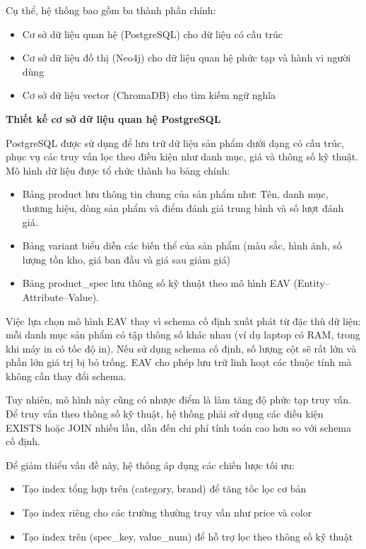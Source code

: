 Cụ thể, hệ thống bao gồm ba thành phần chính:

\begin{itemize}
\item Cơ sở dữ liệu quan hệ (PostgreSQL) cho dữ liệu có cấu trúc
\item Cơ sở dữ liệu đồ thị (Neo4j) cho dữ liệu quan hệ phức tạp và hành vi người dùng
\item Cơ sở dữ liệu vector (ChromaDB) cho tìm kiếm ngữ nghĩa
\end{itemize}

\textbf{Thiết kế cơ sở dữ liệu quan hệ PostgreSQL}

PostgreSQL được sử dụng để lưu trữ dữ liệu sản phẩm dưới dạng có cấu trúc, phục vụ các truy vấn lọc theo điều kiện như danh mục, giá và thông số kỹ thuật. Mô hình dữ liệu được tổ chức thành ba bảng chính:

\begin{itemize}
\item Bảng product lưu thông tin chung của sản phẩm như: Tên, danh mục, thương hiệu, dòng sản phẩm và điểm đánh giá trung bình và số lượt đánh giá.
\item Bảng variant biểu diễn các biến thể của sản phẩm (màu sắc, hình ảnh, số lượng tồn kho, giá ban đầu và giá sau giảm giá)
\item Bảng product\_spec lưu thông số kỹ thuật theo mô hình EAV (Entity--Attribute--Value).
\end{itemize}

Việc lựa chọn mô hình EAV thay vì schema cố định xuất phát từ đặc thù dữ liệu: mỗi danh mục sản phẩm có tập thông số khác nhau (ví dụ laptop có RAM, trong khi máy in có tốc độ in). Nếu sử dụng schema cố định, số lượng cột sẽ rất lớn và phần lớn giá trị bị bỏ trống. EAV cho phép lưu trữ linh hoạt các thuộc tính mà không cần thay đổi schema.

Tuy nhiên, mô hình này cũng có nhược điểm là làm tăng độ phức tạp truy vấn. Để truy vấn theo thông số kỹ thuật, hệ thống phải sử dụng các điều kiện EXISTS hoặc JOIN nhiều lần, dẫn đến chi phí tính toán cao hơn so với schema cố định.

Để giảm thiểu vấn đề này, hệ thống áp dụng các chiến lược tối ưu:

\begin{itemize}
\item Tạo index tổng hợp trên (category, brand) để tăng tốc lọc cơ bản
\item Tạo index riêng cho các trường thường truy vấn như price và color
\item Tạo index trên (spec\_key, value\_num) để hỗ trợ lọc theo thông số kỹ thuật
\end{itemize}

